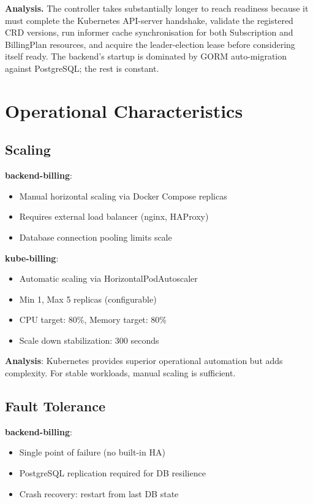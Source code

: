 \textbf{Analysis.} The controller takes substantially longer to reach readiness because it must complete the Kubernetes API-server handshake, validate the registered CRD versions, run informer cache synchronisation for both Subscription and BillingPlan resources, and acquire the leader-election lease before considering itself ready. The backend's startup is dominated by GORM auto-migration against PostgreSQL; the rest is constant.

\section{Operational Characteristics}

\subsection{Scaling}

\textbf{backend-billing}:
\begin{itemize}
    \item Manual horizontal scaling via Docker Compose replicas
    \item Requires external load balancer (nginx, HAProxy)
    \item Database connection pooling limits scale
\end{itemize}

\textbf{kube-billing}:
\begin{itemize}
    \item Automatic scaling via HorizontalPodAutoscaler
    \item Min 1, Max 5 replicas (configurable)
    \item CPU target: 80\%, Memory target: 80\%
    \item Scale down stabilization: 300 seconds
\end{itemize}

\textbf{Analysis}: Kubernetes provides superior operational automation but adds complexity. For stable workloads, manual scaling is sufficient.

\subsection{Fault Tolerance}

\textbf{backend-billing}:
\begin{itemize}
    \item Single point of failure (no built-in HA)
    \item PostgreSQL replication required for DB resilience
    \item Crash recovery: restart from last DB state
\end{itemize}

